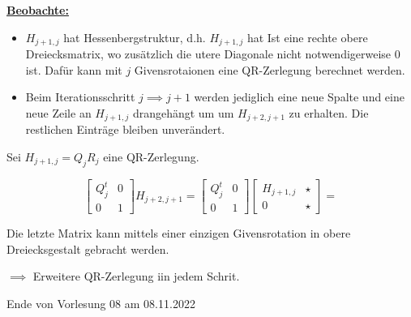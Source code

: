 \documentclass{book}
\begin{document}
            \underline{\textbf{Beobachte:}} \begin{itemize}
                \item $H_{j+1,j}$ hat Hessenbergstruktur, d.h. \(H_{j+1,j}\) hat Ist eine rechte obere Dreiecksmatrix, wo zusätzlich die utere Diagonale nicht notwendigerweise 0 ist. 
                Dafür kann mit $j$ Givensrotaionen eine QR-Zerlegung berechnet werden.
                \item Beim Iterationsschritt $j\implies j+1$ werden jediglich eine neue Spalte und eine neue Zeile an $H_{j+1,j}$ drangehängt um 
                um $H_{j+2,j+1}$ zu erhalten. Die restlichen Einträge bleiben unverändert.
            \end{itemize}

            Sei $H_{j+1,j}=Q_jR_j$ eine QR-Zerlegung.

            \begin{equation*}
                \begin{bmatrix}Q_j^t & 0\\ 0 & 1\end{bmatrix} H_{j+2,j+1} = 
                \begin{bmatrix}Q_j^t & 0\\ 0 & 1\end{bmatrix} \begin{bmatrix}H_{j+1,j} & \star\\ 0 & \star \end{bmatrix} =
            \end{equation*}


            Die letzte Matrix kann mittels einer einzigen Givensrotation in obere Dreiecksgestalt gebracht werden.

            $\implies$ Erweitere QR-Zerlegung iin jedem Schrit.

            \noindent
            \xrfill[0.7ex]{1pt}Ende von Vorlesung 08 am 08.11.2022\xrfill[0.7ex]{1pt}
            
\end{document}
